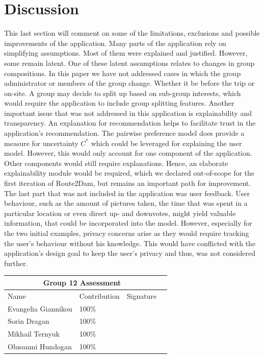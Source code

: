 \documentclass[11pt,a4paper,oneside]{article}
\begin{document}
\section{Discussion}
This last section will comment on some of the limitations, exclusions and possible improvements of the application. Many parts of the application rely on simplifying assumptions. Most of them were explained and justified. However, some remain latent. One of these latent assumptions relates to changes in group compositions. In this paper we have not addressed cases in which the group administrator or members of the group change. Whether it be before the trip or on-site. A group may decide to split up based on sub-group interests, which would require the application to include group splitting features. Another important issue that was not addressed in this application is explainability and transparency. An explanation for recommendation helps to facilitate trust in the application's recommendation. The pairwise preference model does provide a measure for uncertainty $C^*$ which could be leveraged for explaining the user model. However, this would only account for one component of the application. Other components would still require explanations. Hence, an elaborate explainability module would be required, which we declared out-of-scope for the first iteration of Route2Dam, but remains an important path for improvement. The last part that was not included in the application was user feedback. User behaviour, such as the amount of pictures taken, the time that was spent in a particular location or even direct up- and downvotes, might yield valuable information, that could be incorporated into the model. However, especially for the two initial examples, privacy concerns arise as they would require tracking the user's behaviour without his knowledge. This would have conflicted with the application's design goal to keep the user's privacy and thus, was not considered further. 

\clearpage 
\printbibliography

\clearpage
\Large
\begin{tabularx}{\textwidth}{|X|X|X|X|}
\hline
\multicolumn{3}{|c|}{Group 12 Assessment}    \\ \hline
Name                & Contribution & Signature \\ \hline
\hline
Evangelia Giannikou & 100\%        &           \\ \hline
Sorin Dragan        & 100\%        &           \\ \hline
Mikhail Ternyuk     & 100\%        &           \\ \hline
Olusanmi Hundogan   & 100\%        &           \\ \hline
\end{tabularx}
\end{document}
